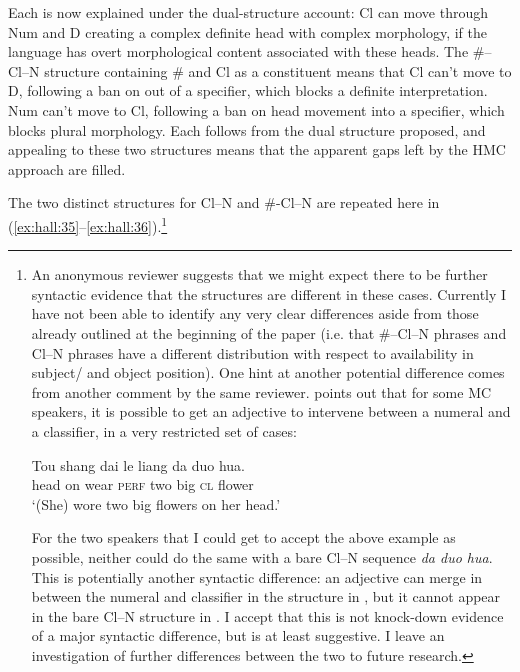 \documentclass[output=paper
,modfonts
,nonflat]{langsci/langscibook}
\begin{document}
Each is now explained under the dual-structure account: Cl can move through Num and D creating a complex definite head with complex morphology, if the language has overt morphological content associated with these heads. The \#--Cl--N structure containing \# and Cl as a constituent means that Cl can't move to D, following a ban on  out of a specifier, which blocks a definite interpretation. Num can't move to Cl, following a ban on head movement into a specifier, which blocks plural morphology. Each follows from the dual structure proposed, and appealing to these two structures means that the apparent gaps left by the HMC approach are filled.\largerpage 

The two distinct structures for Cl--N and \#-Cl--N are repeated here in (\ref{ex:hall:35}--\ref{ex:hall:36}).{\footnote{An anonymous reviewer suggests that we might expect there to be further syntactic evidence that the structures are different in these cases. Currently I have not been able to identify any very clear differences aside from those already outlined at the beginning of the paper (i.e. that \#--Cl--N phrases and Cl--N phrases have a different distribution with respect to availability in subject/ and object position). One hint at another potential difference comes from another comment by the same reviewer. \citet{Li2011} points out that for some MC speakers, it is possible to get an adjective to intervene between a numeral and a classifier, in a very restricted set of cases:
	
\ea
\gll
Tou shang dai le liang da duo hua.\\
{head} {on} {wear} \textsc{perf} {two} {big} \textsc{cl} {flower}\\
\glt
`(She) wore two big flowers on her head.'\\
\z

For the two speakers that I could get to accept the above example as possible, neither could do the same with a bare Cl--N sequence \textit{da duo hua}. This is potentially another syntactic difference: an adjective can merge in between the numeral and classifier in the structure in , but it cannot appear in the bare Cl--N structure in . I accept that this is not knock-down evidence of a major syntactic difference, but is at least suggestive. I leave an investigation of further differences between the two to future research.}} 
\end{document}
